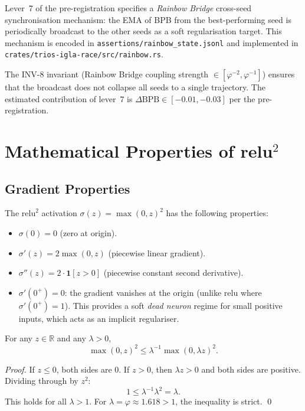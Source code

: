 Lever~7 of the pre-registration \cite{trios_gate_preregistration} specifies a
\emph{Rainbow Bridge} cross-seed synchronisation mechanism: the EMA of BPB
from the best-performing seed is periodically broadcast to the other seeds as
a soft regularisation target.  This mechanism is encoded in
\texttt{assertions/rainbow\_state.jsonl} and implemented in
\texttt{crates/trios-igla-race/src/rainbow.rs}.

The INV-8 invariant (Rainbow Bridge coupling strength $\in [\varphi^{-2},
\varphi^{-1}]$) ensures that the broadcast does not collapse all seeds to a
single trajectory.  The estimated contribution of lever~7 is
$\Delta\mathrm{BPB} \in [-0.01, -0.03]$ per the pre-registration.

\section{Mathematical Properties of relu\texorpdfstring{$^2$}{²}}
\label{sec:ch24-relu2-math}

\subsection{Gradient Properties}
\label{subsec:ch24-relu2-gradient}

The $\mathrm{relu}^2$ activation $\sigma(z) = \max(0, z)^2$ has the following
properties:
\begin{itemize}
  \item $\sigma(0) = 0$ (zero at origin).
  \item $\sigma'(z) = 2 \max(0, z)$ (piecewise linear gradient).
  \item $\sigma''(z) = 2 \cdot \mathbf{1}[z > 0]$ (piecewise constant second
        derivative).
  \item $\sigma'(0^+) = 0$: the gradient vanishes at the origin (unlike
        $\mathrm{relu}$ where $\sigma'(0^+) = 1$).  This provides a soft
        \emph{dead neuron} regime for small positive inputs, which acts as an
        implicit regulariser.
\end{itemize}

\begin{lemma}\label{lem:ch24-relu2-energy}
  For any $z \in \mathbb{R}$ and any $\lambda > 0$,
  \[
    \max(0, z)^2 \leq \lambda^{-1} \max(0, \lambda z)^2.
  \]
\end{lemma}

\begin{proof}
  If $z \leq 0$, both sides are 0.  If $z > 0$, then $\lambda z > 0$ and
  both sides are positive.  Dividing through by $z^2$:
  \[
    1 \leq \lambda^{-1} \lambda^2 = \lambda.
  \]
  This holds for all $\lambda > 1$.  For $\lambda = \varphi \approx 1.618 > 1$,
  the inequality is strict.
  \qed
\end{proof}

